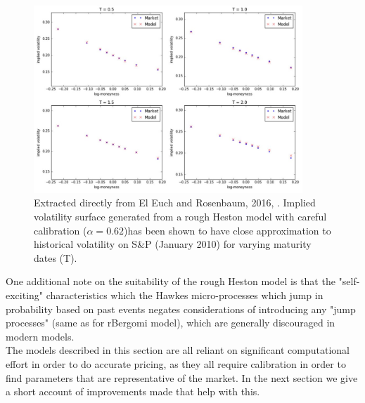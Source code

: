 \documentclass[12pt,oneside]{article}
\begin{document}
\begin{figure}[htpb]
    \centering
    \includegraphics[width=0.9\textwidth ]{figs/Omar2016_fig51.jpg}
    \caption{Extracted directly from El Euch and Rosenbaum, 2016, \cite[Figure~5.1]{Omar2016}. Implied volatility surface generated from a rough Heston model with careful calibration ($\alpha=0.62$)has been shown to have close approximation to historical volatility on S\&P (January 2010) for varying maturity dates (T).}
    \label{fig:elEuch_1}
\end{figure}

One additional note on the suitability of the rough Heston model is that the  "self-exciting" characteristics which the Hawkes micro-processes which jump in probability based on past events negates considerations of introducing any "jump processes" (same as for rBergomi model), which are generally discouraged in modern models. 
\\

The models described in this section are all reliant on significant computational effort in order to do accurate pricing, as they all require calibration in order to find parameters that are representative of the market. In the next section we give a short account of improvements made that help with this.
\end{document}
